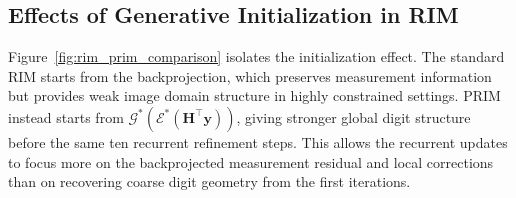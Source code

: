 \documentclass[conference]{IEEEtran}
\begin{document}
\subsection{Effects of Generative Initialization in RIM}

Figure~\ref{fig:rim_prim_comparison} isolates the initialization effect. The standard RIM starts from the backprojection, which preserves measurement information but provides weak image domain structure in highly constrained settings. PRIM instead starts from $\mathcal{G}^{\ast}(\mathcal{E}^{\ast}(\mathbf{H}^{\top}\mathbf{y}))$, giving stronger global digit structure before the same ten recurrent refinement steps. This allows the recurrent updates to focus more on the backprojected measurement residual and local corrections than on recovering coarse digit geometry from the first iterations.

\begin{table}[t!]
\centering
\caption{Single-sample inference runtime. Runtime is reported in ms/img. The Iter. columns indicate ADMM iterations for EADMM/PEADMM, recurrent refinement steps for RIM/PRIM, and one feed-forward pass for GANI.}
\label{tab:inference_runtime}
\setlength{\tabcolsep}{2.2pt}
\renewcommand{\arraystretch}{1.08}
\scriptsize
{}
\vspace{-4mm}
\end{table}
\end{document}
